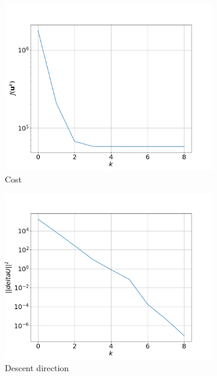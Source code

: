 \begin{figure}[htbp]
    \centering
    \begin{subfigure}[b]{0.49\textwidth}
        \centering
        \includegraphics[width=\textwidth]{figs/downward_cost.png}
        \caption{Cost}
        \label{fig:downward_cost}
    \end{subfigure}
    \hfill
    \begin{subfigure}[b]{0.49\textwidth}
        \centering
        \includegraphics[width=\textwidth]{figs/Downward_Descent.png}
        \caption{Descent direction}
        \label{fig:Downward_Descent}
    \end{subfigure}
    \caption{}
\end{figure}

